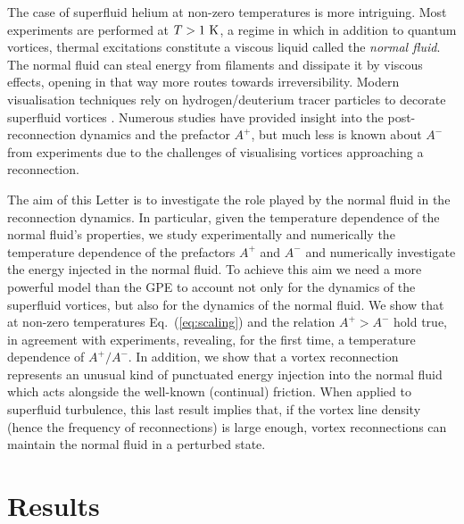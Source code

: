 \documentclass[9pt,twocolumn,twoside]{pnas-new}
\providecommand{\DIFaddend}{} %
\DeclareRobustCommand{\DIFaddend}{\DIFOaddend \let\includegraphics\DIFOincludegraphics} %
\begin{document}
\DIFaddend The case of superfluid helium at non-zero temperatures
is more intriguing. Most experiments are performed at $T>1~\rm K$, a regime in which in addition to quantum vortices, thermal excitations constitute a viscous liquid called the {\it normal fluid}. The normal fluid can steal energy from filaments and dissipate it by viscous effects, opening in that way more routes towards irreversibility. Modern visualisation techniques rely on hydrogen/deuterium tracer particles to decorate superfluid vortices \cite{paoletti2008velocity,bewley2008,guo2014visualization,perettiDirectVisualizationQuantum2023}. Numerous studies have provided insight into the post-reconnection dynamics and the prefactor $A^{+}$, but much less is known about $A^-$ from experiments due to the challenges of visualising vortices approaching a reconnection.

The aim of this Letter is to investigate the role played by the normal fluid in the reconnection dynamics. In particular, given the temperature dependence of the normal fluid's properties, we study experimentally and numerically the temperature dependence of the prefactors $A^+$ and $A^-$ and numerically investigate the energy injected in the normal fluid. 
%
To achieve this aim we need a more powerful model than the GPE to account not only for the dynamics of the
superfluid vortices, but also for the dynamics of the normal fluid. 
We show that at non-zero temperatures Eq.~(\ref{eq:scaling}) and the
relation $A^+>A^-$ hold true, in agreement with experiments, revealing, for the 
first time, a temperature dependence of $A^+/A^-$. In addition, we
show that a vortex
reconnection represents an unusual kind of
punctuated energy injection into the normal fluid which acts alongside
the well-known (continual) friction.
When applied to superfluid turbulence, this last result implies that,
if the vortex line density (hence the frequency of reconnections) is large enough, vortex reconnections can maintain the normal fluid in a perturbed state.


\section*{Results}
\end{document}
